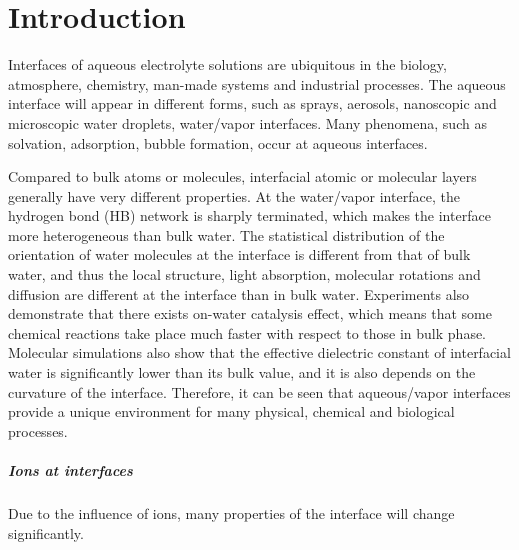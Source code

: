 \chapter{Introduction}\label{CHAPTER_1}
Interfaces of aqueous electrolyte solutions are ubiquitous in the biology, atmosphere, chemistry, man-made systems 
and industrial processes\cite{Irwin88,Tobias99, Benderskii00, 
Asahi01,Benderskii02,Richmond02,LiuH04,
TianCS08,Yamamoto2008, Salmeron2009,ZhangLY09,
LoNostro2012,Piatkowski2014,Balajka2018}.
The aqueous interface will appear in different forms, such as sprays, aerosols, nanoscopic and  microscopic water droplets, water/vapor interfaces.
Many phenomena, such as solvation\cite{Benjamin1996}, adsorption\cite{Chang06}, bubble formation\cite{Craig1993,Craig1993b,Weissenborn1995,Marcelja04,Craig04},
occur at aqueous interfaces\cite{Ball2008,Kuo2004b}. 

Compared to bulk atoms or molecules, interfacial atomic or molecular layers generally have very different properties. 
At the water/vapor interface, the hydrogen bond (HB) network is sharply terminated, which makes the interface more heterogeneous 
than bulk water\cite{singh2013}. 
The statistical distribution of the orientation of water molecules at the interface is different from that of bulk water,
and thus the local structure, light absorption,  molecular rotations and diffusion are different at the interface than in bulk water\cite{Jedlovszky2004}.
Experiments also demonstrate that there exists on-water catalysis effect, which means that some chemical reactions take place much faster 
with respect to those in bulk phase\cite{Rideout1980,Narayan2005,Beattie2010}.
Molecular simulations also show that the effective dielectric constant of interfacial water is significantly lower than its bulk value, 
and it is also depends on the curvature of the interface\cite{Dinpajooh2016}. 
Therefore, it can be seen that aqueous/vapor interfaces provide a unique environment for many physical, chemical and biological processes. 

\paragraph{Ions at interfaces}
Due to the influence of ions, many properties of the interface will change significantly.

